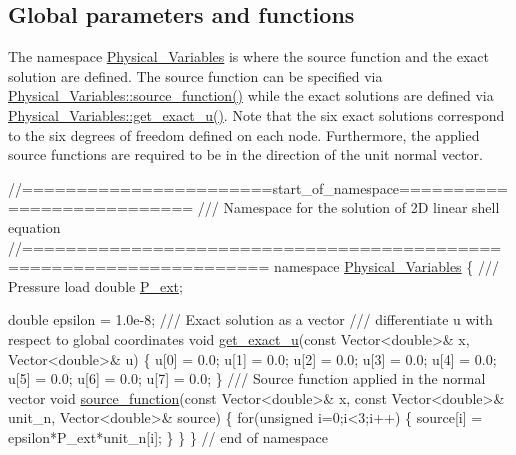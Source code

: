 \hypertarget{index_global}{}\subsection{Global parameters and functions}\label{index_global}
The namespace {\ttfamily \hyperlink{namespacePhysical__Variables}{Physical\+\_\+\+Variables}} is where the source function and the exact solution are defined. The source function can be specified via {\ttfamily \hyperlink{namespacePhysical__Variables_a36f0d0dc5f8aa4eafd7c4d6fe943c4e8}{Physical\+\_\+\+Variables\+::source\+\_\+function()}} while the exact solutions are defined via {\ttfamily \hyperlink{namespacePhysical__Variables_af90d0c580c57b1152fd1cc7046055031}{Physical\+\_\+\+Variables\+::get\+\_\+exact\+\_\+u()}}. Note that the six exact solutions correspond to the six degrees of freedom defined on each node. Furthermore, the applied source functions are required to be in the direction of the unit normal vector.

 
\begin{DoxyCodeInclude}
\textcolor{comment}{//=======================start\_of\_namespace===========================}
\textcolor{comment}{/// Namespace for the solution of 2D linear shell equation}
\textcolor{comment}{}\textcolor{comment}{//====================================================================}
\textcolor{keyword}{namespace }\hyperlink{namespacePhysical__Variables}{Physical\_Variables}
\{\textcolor{comment}{}
\textcolor{comment}{ /// Pressure load}
\textcolor{comment}{} \textcolor{keywordtype}{double} \hyperlink{namespacePhysical__Variables_a58adc76bae4751599143c613f9100904}{P\_ext};
 
 \textcolor{keywordtype}{double} epsilon = 1.0e-8;
 \textcolor{comment}{}
\textcolor{comment}{ /// Exact solution as a vector}
\textcolor{comment}{ /// differentiate u with respect to global coordinates }
\textcolor{comment}{} \textcolor{keywordtype}{void} \hyperlink{namespacePhysical__Variables_af90d0c580c57b1152fd1cc7046055031}{get\_exact\_u}(\textcolor{keyword}{const} Vector<double>& x, Vector<double>& u)
 \{
  u[0] = 0.0;
  u[1] = 0.0;
  u[2] = 0.0;
  u[3] = 0.0;
  u[4] = 0.0;
  u[5] = 0.0;
  u[6] = 0.0;
  u[7] = 0.0;
 \}
\textcolor{comment}{}
\textcolor{comment}{ /// Source function applied in the normal vector }
\textcolor{comment}{} \textcolor{keywordtype}{void} \hyperlink{namespacePhysical__Variables_a36f0d0dc5f8aa4eafd7c4d6fe943c4e8}{source\_function}(\textcolor{keyword}{const} Vector<double>& x, \textcolor{keyword}{const} Vector<double>& unit\_n, Vector<double>&
       source)
 \{
  \textcolor{keywordflow}{for}(\textcolor{keywordtype}{unsigned} i=0;i<3;i++)
   \{
    source[i] = epsilon*P\_ext*unit\_n[i];
   \}
 \}
\} \textcolor{comment}{// end of namespace}

\end{DoxyCodeInclude}




